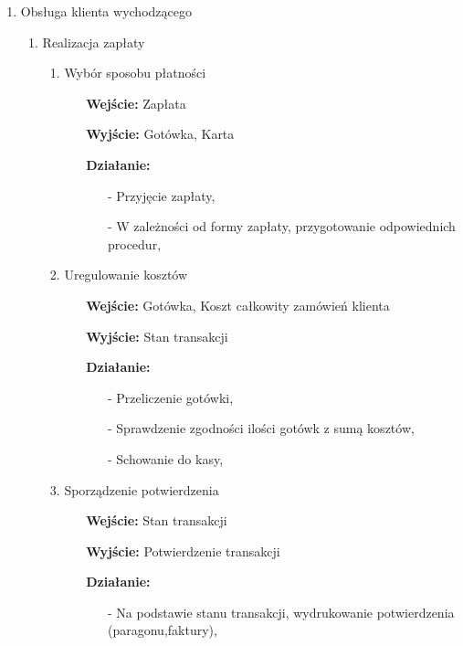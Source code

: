 \documentclass[a4paper, 11pt]{article}
\begin{document}
\begin{enumerate}[label*=\arabic*.]
\begin{enumerate}[label*=\arabic*.]
\begin{enumerate}[label*=\arabic*.]
\begin{itemize}
\begin{itemize}
					\end{itemize}														
				\end{itemize}	
			\end{enumerate}									
			\item Obsługa klienta wychodzącego
			\begin{enumerate}[label*=\arabic*.]
				\item Realizacja zapłaty
				\begin{enumerate}[label*=\arabic*.]
					\item Wybór sposobu płatności
					\begin{itemize}
						\item [\textbf{Wejście:}] Zapłata
						\item [\textbf{Wyjście:}] Gotówka, Karta
						\item [\textbf{Działanie:}] 
						\begin{itemize}
							\item[-] Przyjęcie zapłaty,
							\item[-] W zależności od formy zapłaty, przygotowanie odpowiednich procedur,							
						\end{itemize}
					\end{itemize}
					\item Uregulowanie kosztów
					\begin{itemize}
						\item [\textbf{Wejście:}] Gotówka, Koszt całkowity zamówień klienta
						\item [\textbf{Wyjście:}] Stan transakcji
						\item [\textbf{Działanie:}] 
						\begin{itemize}
							\item[-] Przeliczenie gotówki,
							\item[-] Sprawdzenie zgodności ilości gotówk z sumą kosztów,
							\item[-] Schowanie do kasy,							
						\end{itemize}
					\end{itemize}					
					\item Sporządzenie potwierdzenia
					\begin{itemize}
						\item [\textbf{Wejście:}] Stan transakcji
						\item [\textbf{Wyjście:}] Potwierdzenie transakcji
						\item [\textbf{Działanie:}] 
						\begin{itemize}
							\item[-] Na podstawie stanu transakcji, wydrukowanie potwierdzenia (paragonu,faktury),

\end{itemize}
\end{itemize}
\end{enumerate}
\end{enumerate}
\end{enumerate}
\end{enumerate}
\end{document}

